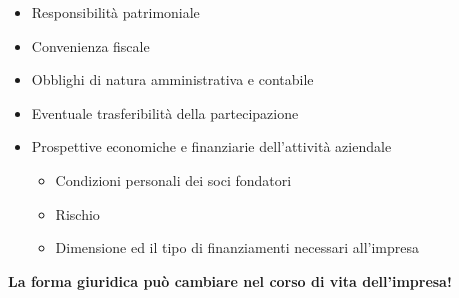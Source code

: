 \documentclass[../main.tex]{subfiles}
\begin{document}
\begin{itemize}
\item Responsibilità patrimoniale
\item Convenienza fiscale
\item Obblighi di natura amministrativa e contabile
\item Eventuale trasferibilità della partecipazione
\item Prospettive economiche e finanziarie dell'attività aziendale
\begin{itemize}
\item Condizioni personali dei soci fondatori
\item Rischio
\item Dimensione ed il tipo di finanziamenti necessari all'impresa
\end{itemize}
\end{itemize}

\textbf{La forma giuridica può cambiare nel corso di vita dell'impresa!}
\end{document}
